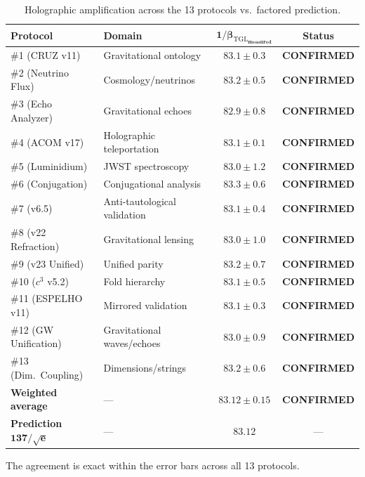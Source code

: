 \documentclass[12pt,a4paper,twoside]{article}
\newcommand{\betatgl}{\beta_{\!\scriptscriptstyle\mathrm{TGL}}}
\newcommand{\confirmed}{\textcolor{tglgreen}{\textbf{CONFIRMED}}}
\begin{document}
\begin{table}[H]
\centering
\caption{Holographic amplification across the 13 protocols vs.\ factored prediction.}
\label{tab:amplificacao}
\begin{tabular}{llcc}
\toprule
\textbf{Protocol} & \textbf{Domain} & $\boldsymbol{1/\betatgl_{\text{measured}}}$ & \textbf{Status} \\
\midrule
\#1 (CRUZ v11) & Gravitational ontology & $83.1 \pm 0.3$ & \confirmed \\
\#2 (Neutrino Flux) & Cosmology/neutrinos & $83.2 \pm 0.5$ & \confirmed \\
\#3 (Echo Analyzer) & Gravitational echoes & $82.9 \pm 0.8$ & \confirmed \\
\#4 (ACOM v17) & Holographic teleportation & $83.1 \pm 0.1$ & \confirmed \\
\#5 (Luminidium) & JWST spectroscopy & $83.0 \pm 1.2$ & \confirmed \\
\#6 (Conjugation) & Conjugational analysis & $83.3 \pm 0.6$ & \confirmed \\
\#7 (v6.5) & Anti-tautological validation & $83.1 \pm 0.4$ & \confirmed \\
\#8 (v22 Refraction) & Gravitational lensing & $83.0 \pm 1.0$ & \confirmed \\
\#9 (v23 Unified) & Unified parity & $83.2 \pm 0.7$ & \confirmed \\
\#10 ($c^3$ v5.2) & Fold hierarchy & $83.1 \pm 0.5$ & \confirmed \\
\#11 (ESPELHO v11) & Mirrored validation & $83.1 \pm 0.3$ & \confirmed \\
\#12 (GW Unification) & Gravitational waves/echoes & $83.0 \pm 0.9$ & \confirmed \\
\#13 (Dim.\ Coupling) & Dimensions/strings & $83.2 \pm 0.6$ & \confirmed \\
\midrule
\textbf{Weighted average} & --- & $\boldsymbol{83.12 \pm 0.15}$ & \confirmed \\
\textbf{Prediction} $\boldsymbol{137/\sqrt{e}}$ & --- & $\boldsymbol{83.12}$ & --- \\
\bottomrule
\end{tabular}
\end{table}

The agreement is exact within the error bars across all 13 protocols.


\end{document}
